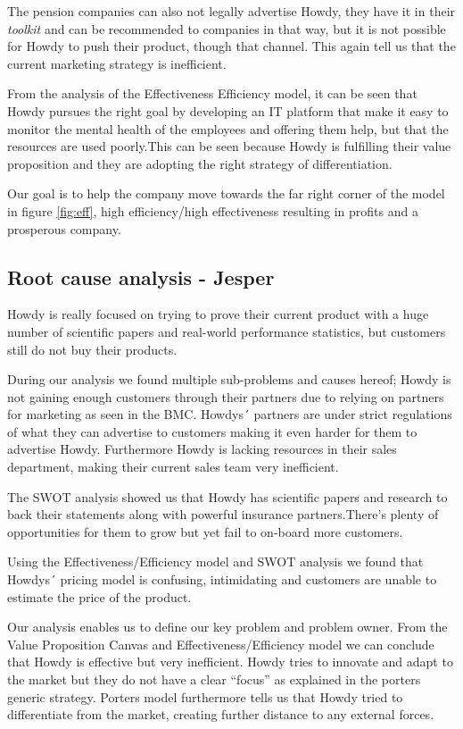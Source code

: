\noindent The pension companies can also not legally advertise Howdy, they have it in their \textit{toolkit} and can be recommended to companies in that way, but it is not possible for Howdy to push their product, though that channel. This again tell us that the current marketing strategy is inefficient. 

\noindent From the analysis of the Effectiveness Efficiency model, it can be seen that Howdy pursues the right goal by developing an IT platform that make it easy to monitor the mental health of the employees and offering them help, but that the resources
are used poorly.This can be seen because Howdy is fulfilling their value proposition and they are adopting the right strategy of differentiation.

\noindent Our goal is to help the company move towards the far right corner of the model in figure \ref{fig:eff}, high efficiency/high effectiveness resulting in profits and a prosperous company. 


\subsection{Root cause analysis - Jesper}
Howdy is really focused on trying to prove their current product with a huge number of scientific papers and real-world performance statistics, but customers still do not buy their products. 

\noindent During our analysis we found multiple sub-problems and causes hereof; Howdy is not gaining enough customers through their partners due to relying on partners for marketing as seen in the BMC. Howdys´ partners are under strict regulations of what they can advertise to customers making it even harder for them to advertise Howdy. Furthermore Howdy is lacking resources in their sales department, making their current sales team very inefficient.

\noindent The SWOT analysis showed us that Howdy has scientific papers and research to back their statements along with powerful insurance partners.There’s plenty of opportunities for them to grow but yet fail to on-board more customers.

\noindent Using the Effectiveness/Efficiency model and SWOT analysis we found that Howdys´ pricing model is confusing, intimidating and customers are unable to estimate the price of the product.

\noindent Our analysis enables us to define our key problem and problem owner. From the Value Proposition Canvas and Effectiveness/Efficiency model we can conclude that Howdy is effective  but very inefficient. Howdy tries to innovate and adapt to the market but they do not have a clear “focus” as explained in the porters generic strategy. Porters model furthermore tells us that Howdy tried to differentiate from the market, creating further distance to any external forces\cite[p.190]{jones_george_2013}.

